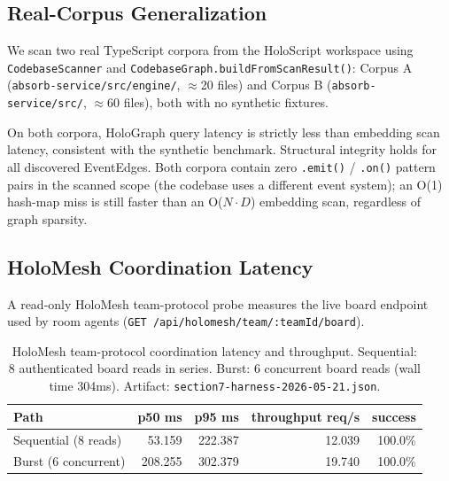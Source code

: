 \subsection{Real-Corpus Generalization}
\label{sec:eval-real-corpus}

We scan two real TypeScript corpora from the HoloScript workspace using
\texttt{CodebaseScanner} and \texttt{CodebaseGraph.buildFromScanResult()}: Corpus A
(\texttt{absorb-service/src/engine/}, $\approx$20 files) and Corpus B
(\texttt{absorb-service/src/}, $\approx$60 files), both with no synthetic fixtures.

On both corpora, HoloGraph query latency is strictly less than embedding scan
latency, consistent with the synthetic benchmark.  Structural integrity holds
for all discovered EventEdges.  Both corpora contain zero
\texttt{.emit()} / \texttt{.on()} pattern pairs in the scanned scope (the
codebase uses a different event system); an O(1) hash-map miss is still faster
than an O($N \cdot D$) embedding scan, regardless of graph sparsity.

\subsection{HoloMesh Coordination Latency}
\label{sec:eval-holomesh-coordination}

A read-only HoloMesh team-protocol probe measures the live board endpoint used
by room agents (\texttt{GET /api/holomesh/team/:teamId/board}).

\begin{table}[h]
\centering
\caption{HoloMesh team-protocol coordination latency and throughput.
  Sequential: 8 authenticated board reads in series.
  Burst: 6 concurrent board reads (wall time 304ms).
  Artifact: \texttt{section7-harness-2026-05-21.json}.}
\label{tab:holomesh-coordination}
\begin{tabular}{lrrrr}
\toprule
Path & p50 ms & p95 ms & throughput req/s & success \\
\midrule
Sequential (8 reads) & 53.159 & 222.387 & 12.039 & 100.0\% \\
Burst (6 concurrent) & 208.255 & 302.379 & 19.740 & 100.0\% \\
\bottomrule
\end{tabular}
\end{table}

